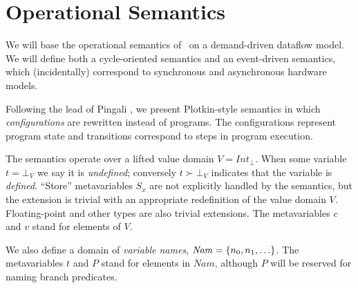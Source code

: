 \documentclass[12pt,notitlepage,twoside]{article}
\begin{document}
\section{Operational Semantics}
We will base the operational semantics of \ssiplus\ on a demand-driven
dataflow model.  We will define both a cycle-oriented semantics and an
event-driven semantics, which (incidentally) correspond to synchronous
and asynchronous hardware models.

Following the lead of Pingali \cite{pingali90:dfg}, we present Plotkin-style
semantics \cite{plotkin81:opsem} in which \emph{configurations} are
rewritten instead of programs.  The configurations represent program
state and transitions correspond to steps in program execution.

The semantics operate over a lifted value domain
$V=\mathit{Int}_\bot$. When some variable $t = \bot_V$ we say it is
\emph{undefined}; conversely $t\succ\bot_V$ indicates that the
variable is \emph{defined}.  ``Store'' metavariables $S_x$ are not
explicitly handled by the semantics, but the extension is trivial with
an appropriate redefinition of the value domain $V$.  Floating-point
and other types are also trivial extensions.  The
metavariables $c$ and $v$ stand for elements of $V$.

We also define a domain of \emph{variable names},
$\mathit{Nam}=\left\{n_0,n_1,\ldots\right\}$.  The metavariables $t$ and $P$ stand for
elements in $\mathit{Nam}$, although $P$ will be reserved for naming branch predicates.
\end{document}
